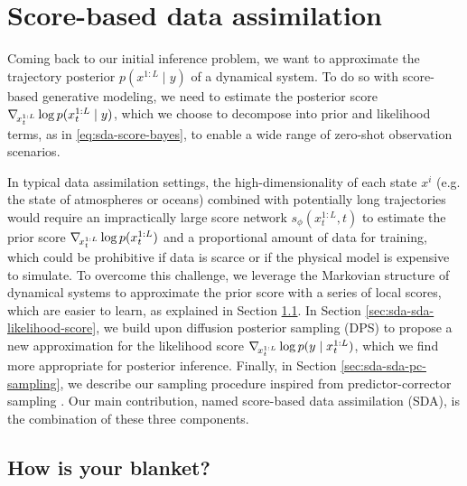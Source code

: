 \section{Score-based data assimilation}

Coming back to our initial inference problem, we want to approximate the trajectory posterior $p(x^{1:L} \mid y)$ of a dynamical system. To do so with score-based generative modeling, we need to estimate the posterior score $\nabla_{\!{x^{1:L}_t}} \log p(x^{1:L}_t \mid y)$, which we choose to decompose into prior and likelihood terms, as in \eqref{eq:sda-score-bayes}, to enable a wide range of zero-shot observation scenarios.

In typical data assimilation settings, the high-dimensionality of each state $x^i$ (e.g. the state of atmospheres or oceans) combined with potentially long trajectories would require an impractically large score network $s_\phi(x^{1:L}_t, t)$ to estimate the prior score $\nabla_{\!{x^{1:L}_t}} \log p(x^{1:L}_t)$ and a proportional amount of data for training, which could be prohibitive if data is scarce or if the physical model is expensive to simulate. To overcome this challenge, we leverage the Markovian structure of dynamical systems to approximate the prior score with a series of local scores, which are easier to learn, as explained in Section \ref{sec:sda-sda-blanket}.
%
In Section \ref{sec:sda-sda-likelihood-score}, we build upon diffusion posterior sampling (DPS) \cite{chung2023diffusion} to propose a new approximation for the likelihood score $\nabla_{\!{x^{1:L}_t}} \log p(y \mid x^{1:L}_t)$, which we find more appropriate for posterior inference. Finally, in Section \ref{sec:sda-sda-pc-sampling}, we describe our sampling procedure inspired from predictor-corrector sampling \cite{song2021scorebased}. Our main contribution, named score-based data assimilation (SDA), is the combination of these three components.

\subsection{How is your blanket?} \label{sec:sda-sda-blanket}


